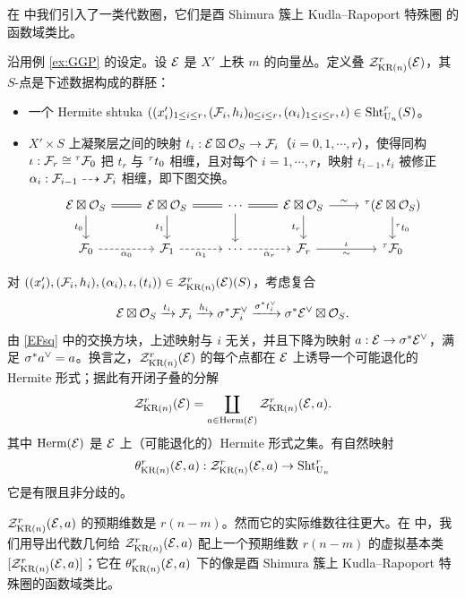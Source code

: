 \begin{exam}\label{ex:KR}
在 \cite{FYZ1} 中我们引入了一类代数圈，它们是酉 Shimura 簇上 Kudla–Rapoport 特殊圈 \cite{KR2} 的函数域类比。

沿用例 \ref{ex:GGP} 的设定。设 $\mathcal{E}$ 是 $X'$ 上秩 $m$ 的向量丛。定义叠 $\mathcal{Z}_{\textup{KR}(n)}^{r}(\mathcal{E})$，其 $S$-点是下述数据构成的群胚：
 \begin{itemize}
 \item 一个 Hermite shtuka $((x'_i)_{1\le i\le r}, (\mathcal{F}_{i},h_{i})_{0\le i\le r}, (\alpha_{i})_{1\le i\le r}, \iota) \in  \textup{Sht}_{\textup{U}_{n}}^{r}(S)$。
 \item $X'\times S$ 上凝聚层之间的映射 $t_i : \mathcal{E} \boxtimes \mathcal{O}_{S} \to \mathcal{F}_i$（$i=0,1,\cdots, r$），使得同构 $\iota : \mathcal{F}_r \cong {}^{\tau}\mathcal{F}_0$ 把 $t_r$ 与 ${}^{\tau}t_0$ 相缠，且对每个 $i = 1, \cdots, r$，映射 $t_{i-1}, t_{i}$ 被修正 $\alpha_i :  \mathcal{F}_{i-1} \dashrightarrow \mathcal{F}_{i}$ 相缠，即下图交换。
\begin{equation}\label{EFsq}
\begin{tikzcd}
\cE\boxtimes\cO_{S} \arrow[r,equal] \arrow[d,"t_{0}"'] & \cE\boxtimes\cO_{S} \arrow[r,equal] \arrow[d,"t_1"'] & \cdots \arrow[r,equal] \arrow[d] & \cE\boxtimes\cO_{S} \arrow[r,"\sim"] \arrow[d,"t_{r}"'] & {}^{\t}(\cE \boxtimes\cO_{S}) \arrow[d,"{}^{\t}t_{0}"] \\
\cF_0 \arrow[r,dashed,"\a_0"'] & \cF_1 \arrow[r,dashed,"\a_1"'] & \cdots \arrow[r,dashed,"\a_r"'] & \cF_{r} \arrow[r,"\io","\sim"'] & {}^{\t}\cF_0
\end{tikzcd}
\end{equation}
 \end{itemize}

对 $((x'_i), (\mathcal{F}_i,h_{i}), (\alpha_i), \iota, (t_i)) \in \mathcal{Z}_{\textup{KR}(n)}^r(\mathcal{E})(S)$，考虑复合
\begin{equation*}
\mathcal{E} \boxtimes \mathcal{O}_S \xrightarrow{t_i} \mathcal{F}_i \xrightarrow{h_i} \sigma^* \mathcal{F}_i^{\vee} \xrightarrow{\sigma^* t^{\vee}_{i}} \sigma^* \mathcal{E}^{\vee} \boxtimes \mathcal{O}_S.
\end{equation*}
由 \eqref{EFsq} 中的交换方块，上述映射与 $i$ 无关，并且下降为映射 $a: \mathcal{E}\to \sigma^{*}\mathcal{E}^{\vee}$，满足 $\sigma^{*}a^{\vee}=a$。换言之，$\mathcal{Z}^{r}_{\textup{KR}(n)}(\mathcal{E})$ 的每个点都在 $\mathcal{E}$ 上诱导一个可能退化的 Hermite 形式；据此有开闭子叠的分解
\begin{equation*}
\mathcal{Z}_{\textup{KR}(n)}^{r}(\mathcal{E})=\coprod_{a\in \textup{Herm}(\mathcal{E})} \mathcal{Z}^{r}_{\textup{KR}(n)}(\mathcal{E},a).
\end{equation*}
其中 $\textup{Herm}(\mathcal{E})$ 是 $\mathcal{E}$ 上（可能退化的）Hermite 形式之集。有自然映射
\begin{equation*}
\theta_{\textup{KR}(n)}^{r}(\mathcal{E},a): \mathcal{Z}^{r}_{\textup{KR}(n)}(\mathcal{E},a)\to \textup{Sht}^{r}_{\textup{U}_{n}}
\end{equation*}
它是有限且非分歧的。

$\mathcal{Z}^{r}_{\textup{KR}(n)}(\mathcal{E},a)$ 的预期维数是 $r(n-m)$。然而它的实际维数往往更大。在 \cite{FYZ2} 中，我们用导出代数几何给 $\mathcal{Z}^{r}_{\textup{KR}(n)}(\mathcal{E},a)$ 配上一个预期维数 $r(n-m)$ 的虚拟基本类 $[\mathcal{Z}^{r}_{\textup{KR}(n)}(\mathcal{E},a)]$；它在 $\theta^{r}_{\textup{KR}(n)}(\mathcal{E},a)$ 下的像是酉 Shimura 簇上 Kudla–Rapoport 特殊圈的函数域类比。
\end{exam}

